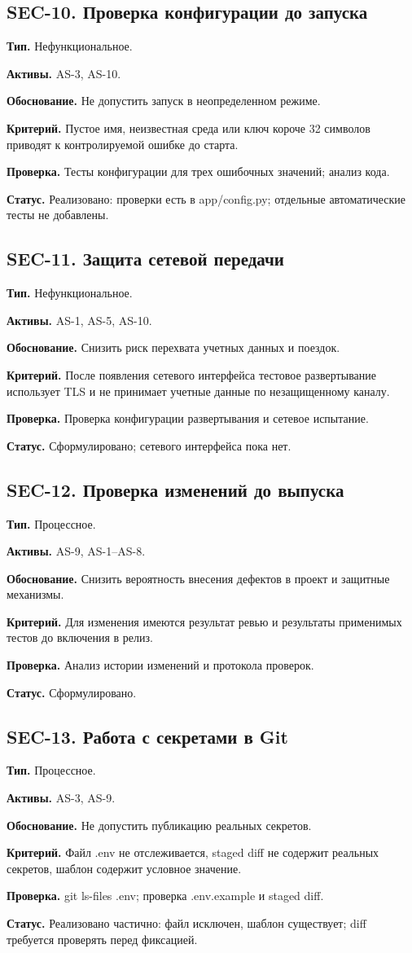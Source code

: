\documentclass[12pt,a4paper]{article}
\newcommand{\field}[2]{\noindent\textbf{#1.} #2\par}
\begin{document}
\subsection*{SEC-10. Проверка конфигурации до запуска}
\field{Тип}{Нефункциональное.}
\field{Активы}{AS-3, AS-10.}
\field{Обоснование}{Не допустить запуск в неопределенном режиме.}
\field{Критерий}{Пустое имя, неизвестная среда или ключ короче 32 символов приводят к контролируемой ошибке до старта.}
\field{Проверка}{Тесты конфигурации для трех ошибочных значений; анализ кода.}
\field{Статус}{Реализовано: проверки есть в app/config.py; отдельные автоматические тесты не добавлены.}

\subsection*{SEC-11. Защита сетевой передачи}
\field{Тип}{Нефункциональное.}
\field{Активы}{AS-1, AS-5, AS-10.}
\field{Обоснование}{Снизить риск перехвата учетных данных и поездок.}
\field{Критерий}{После появления сетевого интерфейса тестовое развертывание использует TLS и не принимает учетные данные по незащищенному каналу.}
\field{Проверка}{Проверка конфигурации развертывания и сетевое испытание.}
\field{Статус}{Сформулировано; сетевого интерфейса пока нет.}

\subsection*{SEC-12. Проверка изменений до выпуска}
\field{Тип}{Процессное.}
\field{Активы}{AS-9, AS-1--AS-8.}
\field{Обоснование}{Снизить вероятность внесения дефектов в проект и защитные механизмы.}
\field{Критерий}{Для изменения имеются результат ревью и результаты применимых тестов до включения в релиз.}
\field{Проверка}{Анализ истории изменений и протокола проверок.}
\field{Статус}{Сформулировано.}

\subsection*{SEC-13. Работа с секретами в Git}
\field{Тип}{Процессное.}
\field{Активы}{AS-3, AS-9.}
\field{Обоснование}{Не допустить публикацию реальных секретов.}
\field{Критерий}{Файл .env не отслеживается, staged diff не содержит реальных секретов, шаблон содержит условное значение.}
\field{Проверка}{git ls-files .env; проверка .env.example и staged diff.}
\field{Статус}{Реализовано частично: файл исключен, шаблон существует; diff требуется проверять перед фиксацией.}
\end{document}
